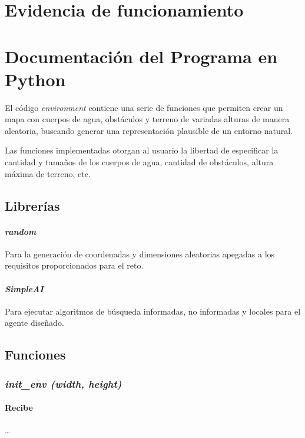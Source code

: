 \documentclass[12pt, letterpaper]{article}
\begin{document}
\section{Evidencia de funcionamiento}

\section{Documentación del Programa en Python}

El código \textit{environment} contiene una serie de funciones que permiten crear un mapa con cuerpos de agua, obstáculos y terreno de variadas alturas de manera aleatoria, buscando generar una representación plausible de un entorno natural.

Las funciones implementadas otorgan al usuario la libertad de especificar la cantidad y tamaños de los cuerpos de agua, cantidad de obstáculos, altura máxima de terreno, etc.

    \subsection{Librerías}
        \paragraph{\textit{random}}
        \cite{abdugafforovna2023modules} Para la generación de coordenadas y dimensiones aleatorias apegadas a los requisitos proporcionados para el reto.

        \paragraph{\textit{SimpleAI}}
        \cite{thaker2020python} Para ejecutar algoritmos de búsqueda informadas, no informadas y locales para el agente diseñado.

    \subsection{Funciones}

        \subsubsection{\textit{init\_env (width, height)}}

            \paragraph{Recibe}
            \dots
\end{document}
